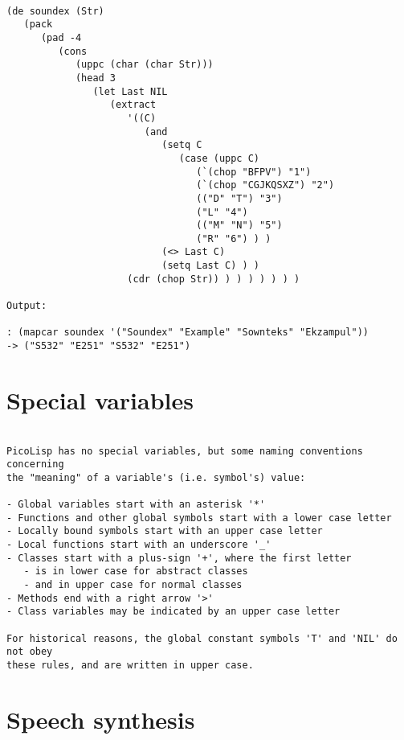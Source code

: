 \begin{verbatim}

(de soundex (Str)
   (pack
      (pad -4
         (cons
            (uppc (char (char Str)))
            (head 3
               (let Last NIL
                  (extract
                     '((C)
                        (and
                           (setq C
                              (case (uppc C)
                                 (`(chop "BFPV") "1")
                                 (`(chop "CGJKQSXZ") "2")
                                 (("D" "T") "3")
                                 ("L" "4")
                                 (("M" "N") "5")
                                 ("R" "6") ) )
                           (<> Last C)
                           (setq Last C) ) )
                     (cdr (chop Str)) ) ) ) ) ) ) )

Output:

: (mapcar soundex '("Soundex" "Example" "Sownteks" "Ekzampul"))
-> ("S532" "E251" "S532" "E251")

\end{verbatim}

\section*{Special variables}

\begin{verbatim}

PicoLisp has no special variables, but some naming conventions concerning
the "meaning" of a variable's (i.e. symbol's) value:

- Global variables start with an asterisk '*'
- Functions and other global symbols start with a lower case letter
- Locally bound symbols start with an upper case letter
- Local functions start with an underscore '_'
- Classes start with a plus-sign '+', where the first letter
   - is in lower case for abstract classes
   - and in upper case for normal classes
- Methods end with a right arrow '>'
- Class variables may be indicated by an upper case letter

For historical reasons, the global constant symbols 'T' and 'NIL' do not obey
these rules, and are written in upper case.

\end{verbatim}

\section*{Speech synthesis}

